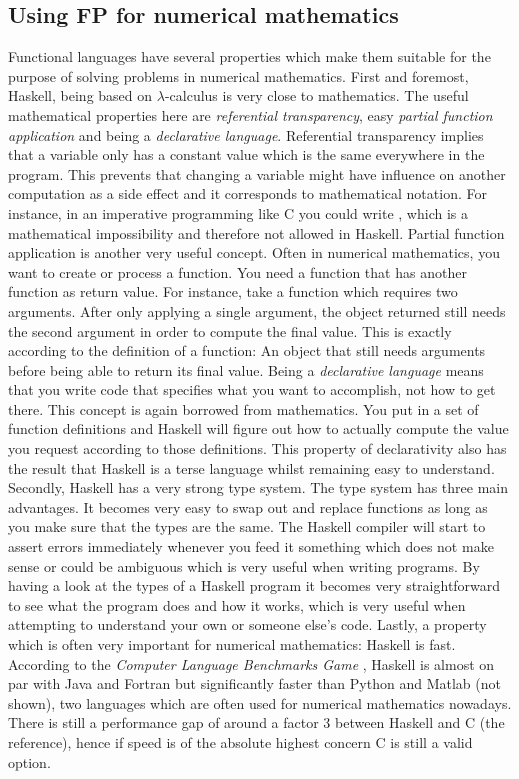 \subsection{Using FP for numerical mathematics}
Functional languages have several properties which make them suitable for the purpose of solving problems in numerical mathematics. First and foremost, Haskell, being based on $\lambda$-calculus is very close to mathematics. The useful mathematical properties here are \textit{referential transparency}, easy \textit{partial function application} and being a \textit{declarative language}. 
Referential transparency implies that a variable only has a constant value which is the same everywhere in the program. This prevents that changing a variable might have influence on another computation as a side effect and it corresponds to mathematical notation. For instance, in an imperative programming like C you could write , which is a mathematical impossibility and therefore not allowed in Haskell. 
Partial function application is another very useful concept. Often in numerical mathematics, you want to create or process a function. You need a function that has another function as return value. For instance, take a function which requires two arguments. After only applying a single argument, the object returned still needs the second argument in order to compute the final value. This is exactly according to the definition of a function: An object that still needs arguments before being able to return its final value.
Being a \textit{declarative language} means that you write code that specifies what you want to accomplish, not how to get there. This concept is again borrowed from mathematics. You put in a set of function definitions and Haskell will figure out how to actually compute the value you request according to those definitions. This property of declarativity also has the result that Haskell is a terse language whilst remaining easy to understand.
Secondly, Haskell has a very strong type system. The type system has three main advantages. It becomes very easy to swap out and replace functions as long as you make sure that the types are the same. The Haskell compiler will start to assert errors immediately whenever you feed it something which does not make sense or could be ambiguous which is very useful when writing programs. By having a look at the types of a Haskell program it becomes very straightforward to see what the program does and how it works, which is very useful when attempting to understand your own or someone else's code.
Lastly, a property which is often very important for numerical mathematics: Haskell is fast. According to the \textit{Computer Language Benchmarks Game} \cite{Bench}, Haskell is almost on par with Java and Fortran but significantly faster than Python and Matlab (not shown), two languages which are often used for numerical mathematics nowadays. There is still a performance gap of around a factor 3 between Haskell and C (the reference), hence if speed is of the absolute highest concern C is still a valid option.

